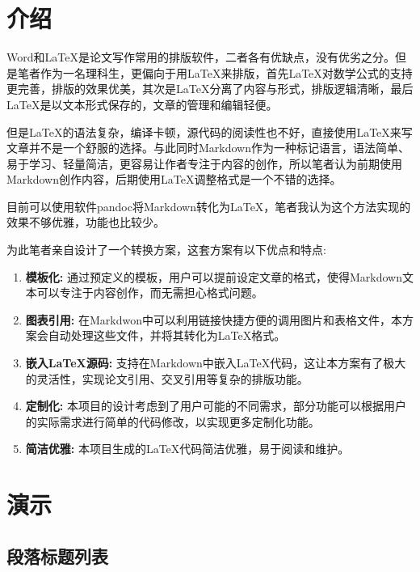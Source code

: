 \documentclass[UTF8]{ctexart}
\begin{document}
\section{介绍}

Word和LaTeX是论文写作常用的排版软件，二者各有优缺点，没有优劣之分。但是笔者作为一名理科生，更偏向于用LaTeX来排版，首先LaTeX对数学公式的支持更完善，排版的效果优美，其次是LaTeX分离了内容与形式，排版逻辑清晰，最后LaTeX是以文本形式保存的，文章的管理和编辑轻便。

但是LaTeX的语法复杂，编译卡顿，源代码的阅读性也不好，直接使用LaTeX来写文章并不是一个舒服的选择。与此同时Markdown作为一种标记语言，语法简单、易于学习、轻量简洁，更容易让作者专注于内容的创作，所以笔者认为前期使用Markdown创作内容，后期使用LaTeX调整格式是一个不错的选择。

目前可以使用软件pandoc将Markdown转化为LaTeX，笔者我认为这个方法实现的效果不够优雅，功能也比较少。

为此笔者亲自设计了一个转换方案，这套方案有以下优点和特点:

\begin{enumerate}
\item \textbf{模板化:} 通过预定义的模板，用户可以提前设定文章的格式，使得Markdown文本可以专注于内容创作，而无需担心格式问题。

\item \textbf{图表引用:} 在Markdwon中可以利用链接快捷方便的调用图片和表格文件，本方案会自动处理这些文件，并将其转化为LaTeX格式。

\item \textbf{嵌入LaTeX源码:} 支持在Markdown中嵌入LaTeX代码，这让本方案有了极大的灵活性，实现论文引用、交叉引用等复杂的排版功能。

\item \textbf{定制化:} 本项目的设计考虑到了用户可能的不同需求，部分功能可以根据用户的实际需求进行简单的代码修改，以实现更多定制化功能。

\item \textbf{简洁优雅:} 本项目生成的LaTeX代码简洁优雅，易于阅读和维护。

\end{enumerate}

\section{演示}

\subsection{段落标题列表}
\end{document}
